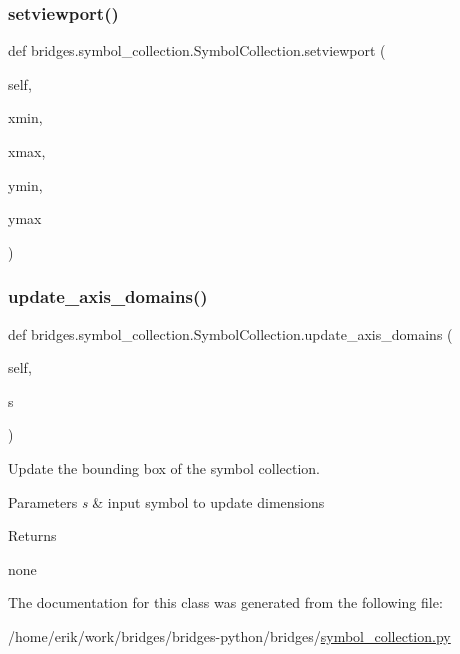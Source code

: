 \subsubsection{\texorpdfstring{setviewport()}{setviewport()}}
{\footnotesize\ttfamily def bridges.\+symbol\+\_\+collection.\+Symbol\+Collection.\+setviewport (\begin{DoxyParamCaption}\item[{}]{self,  }\item[{}]{xmin,  }\item[{}]{xmax,  }\item[{}]{ymin,  }\item[{}]{ymax }\end{DoxyParamCaption})}

\mbox{\label{classbridges_1_1symbol__collection_1_1_symbol_collection_af0906b48ee3ee868bb7779561d3f710c}} 
\subsubsection{\texorpdfstring{update\+\_\+axis\+\_\+domains()}{update\_axis\_domains()}}
{\footnotesize\ttfamily def bridges.\+symbol\+\_\+collection.\+Symbol\+Collection.\+update\+\_\+axis\+\_\+domains (\begin{DoxyParamCaption}\item[{}]{self,  }\item[{}]{s }\end{DoxyParamCaption})}



Update the bounding box of the symbol collection. 


\begin{DoxyParams}{Parameters}
{\em s} & input symbol to update dimensions \\
\hline
\end{DoxyParams}
\begin{DoxyReturn}{Returns}


none 
\end{DoxyReturn}


The documentation for this class was generated from the following file\+:\begin{DoxyCompactItemize}
\item 
/home/erik/work/bridges/bridges-\/python/bridges/\hyperlink{symbol__collection_8py}{symbol\+\_\+collection.\+py}\end{DoxyCompactItemize}
